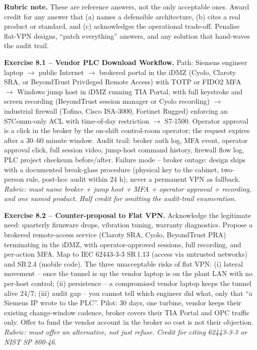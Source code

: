 \documentclass[11pt,a4paper]{article}
\begin{document}
\sheetheader

\noindent\textbf{Rubric note.} These are reference answers, not the only acceptable ones. Award credit for any answer that (a) names a defensible architecture, (b) cites a real product or standard, and (c) acknowledges the operational trade-off. Penalise flat-VPN designs, ``patch everything'' answers, and any solution that hand-waves the audit trail.

\vspace{0.6em}

\begin{solutionbox}
\textbf{Exercise 8.1 -- Vendor PLC Download Workflow.}
Path: Siemens engineer laptop $\to$ public Internet $\to$ brokered portal in the iDMZ (Cyolo, Claroty SRA, or BeyondTrust Privileged Remote Access) with TOTP or FIDO2 MFA $\to$ Windows jump host in iDMZ running TIA Portal, with full keystroke and screen recording (BeyondTrust session manager or Cyolo recording) $\to$ industrial firewall (Tofino, Cisco ISA-3000, Fortinet Rugged) enforcing an S7Comm-only ACL with time-of-day restriction $\to$ S7-1500. Operator approval is a click in the broker by the on-shift control-room operator; the request expires after a 30--60 minute window. Audit trail: broker auth log, MFA event, operator approval click, full session video, jump-host command history, firewall flow log, PLC project checksum before/after. Failure mode -- broker outage: design ships with a documented break-glass procedure (physical key to the cabinet, two-person rule, post-hoc audit within 24 h); never a permanent VPN as fallback.
\textit{Rubric: must name broker + jump host + MFA + operator approval + recording, and one named product. Half credit for omitting the audit-trail enumeration.}
\end{solutionbox}

\begin{solutionbox}
\textbf{Exercise 8.2 -- Counter-proposal to Flat VPN.}
Acknowledge the legitimate need: quarterly firmware drops, vibration tuning, warranty diagnostics. Propose a brokered remote-access service (Claroty SRA, Cyolo, BeyondTrust PRA) terminating in the iDMZ, with operator-approved sessions, full recording, and per-action MFA. Map to IEC 62443-3-3 SR\,1.13 (access via untrusted networks) and SR\,2.4 (mobile code). The three unacceptable risks of flat VPN: (i) lateral movement -- once the tunnel is up the vendor laptop is on the plant LAN with no per-host control; (ii) persistence -- a compromised vendor laptop keeps the tunnel alive 24/7; (iii) audit gap -- you cannot tell which engineer did what, only that ``a Siemens IP wrote to the PLC''. Pilot: 30 days, one turbine, vendor keeps their existing change-window cadence, broker covers their TIA Portal and OPC traffic only. Offer to fund the vendor account in the broker so cost is not their objection.
\textit{Rubric: must offer an alternative, not just refuse. Credit for citing 62443-3-3 or NIST SP 800-46.}
\end{solutionbox}
\end{document}
